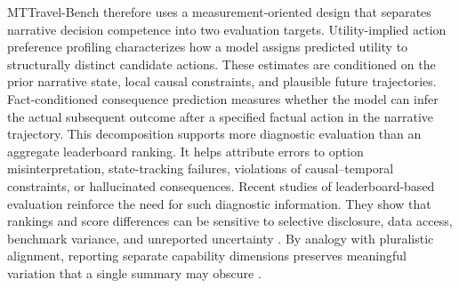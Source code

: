\documentclass[pdflatex,sn-mathphys-num]{sn-jnl}%
\theoremstyle{thmstyleone}%
\theoremstyle{thmstyletwo}%
\theoremstyle{thmstylethree}%
\begin{document}
MTTravel-Bench therefore uses a measurement-oriented design that separates narrative decision competence into two evaluation targets. Utility-implied action preference profiling characterizes how a model assigns predicted utility to structurally distinct candidate actions. These estimates are conditioned on the prior narrative state, local causal constraints, and plausible future trajectories. Fact-conditioned consequence prediction measures whether the model can infer the actual subsequent outcome after a specified factual action in the narrative trajectory. This decomposition supports more diagnostic evaluation than an aggregate leaderboard ranking. It helps attribute errors to option misinterpretation, state-tracking failures, violations of causal--temporal constraints, or hallucinated consequences. Recent studies of leaderboard-based evaluation reinforce the need for such diagnostic information. They show that rankings and score differences can be sensitive to selective disclosure, data access, benchmark variance, and unreported uncertainty \cite{singh2025leaderboard,blackwell2024reproducible,madaan2024quantifying}. By analogy with pluralistic alignment, reporting separate capability dimensions preserves meaningful variation that a single summary may obscure \cite{sorensen2024roadmap}.
\end{document}
